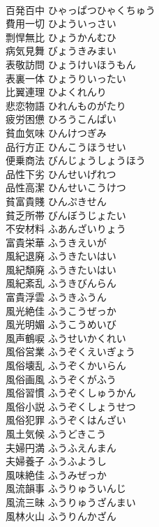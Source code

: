 \documentclass[8pt]{extreport}
\begin{document}
\begin{CJK}{UTF8}{min}
\\	百発百中	ひゃっぱつひゃくちゅう	
\\	費用一切	ひよういっさい	
\\	剽悍無比	ひょうかんむひ	
\\	病気見舞	びょうきみまい	
\\	表敬訪問	ひょうけいほうもん	
\\	表裏一体	ひょうりいったい	
\\	比翼連理	ひよくれんり	
\\	悲恋物語	ひれんものがたり	
\\	疲労困憊	ひろうこんぱい	
\\	貧血気味	ひんけつぎみ	
\\	品行方正	ひんこうほうせい	
\\	便乗商法	びんじょうしょうほう	
\\	品性下劣	ひんせいげれつ	
\\	品性高潔	ひんせいこうけつ	
\\	貧富貴賤	ひんぷきせん	
\\	貧乏所帯	びんぼうじょたい	
\\	不安材料	ふあんざいりょう	
\\	富貴栄華	ふうきえいが	
\\	風紀退廃	ふうきたいはい	
\\	風紀頽廃	ふうきたいはい	
\\	風紀紊乱	ふうきびんらん	
\\	富貴浮雲	ふうきふうん	
\\	風光絶佳	ふうこうぜっか	
\\	風光明媚	ふうこうめいび	
\\	風声鶴唳	ふうせいかくれい	
\\	風俗営業	ふうぞくえいぎょう	
\\	風俗壊乱	ふうぞくかいらん	
\\	風俗画風	ふうぞくがふう	
\\	風俗習慣	ふうぞくしゅうかん	
\\	風俗小説	ふうぞくしょうせつ	
\\	風俗犯罪	ふうぞくはんざい	
\\	風土気候	ふうどきこう	
\\	夫婦円満	ふうふえんまん	
\\	夫婦養子	ふうふようし	
\\	風味絶佳	ふうみぜっか	
\\	風流韻事	ふうりゅういんじ	
\\	風流三昧	ふうりゅうざんまい	
\\	風林火山	ふうりんかざん	

\end{CJK}
\end{document}

